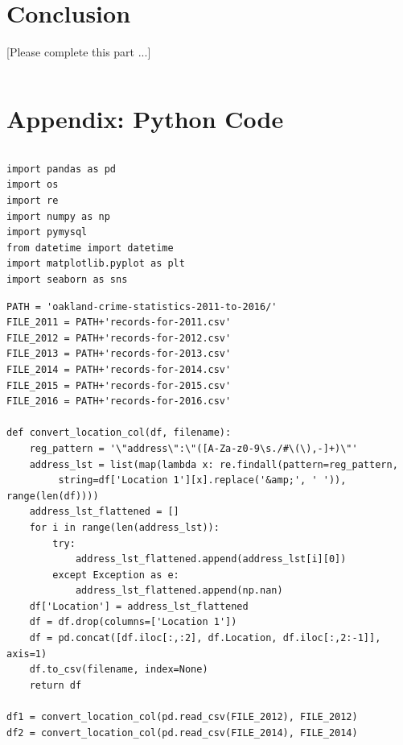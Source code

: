 \documentclass{article} %
\begin{document}
\section{Conclusion}


[Please complete this part ...]

\[\]





\section{Appendix: Python Code}

\[\]

\appendix

\lstset{language=python}
\lstset{frame=lines}
\lstset{basicstyle=\footnotesize}
\begin{lstlisting}
import pandas as pd
import os
import re
import numpy as np
import pymysql 
from datetime import datetime
import matplotlib.pyplot as plt
import seaborn as sns
\end{lstlisting}



\label{appendix:preprocess}
\lstset{language=python}
\lstset{frame=lines}
\lstset{basicstyle=\footnotesize}
\begin{lstlisting}
PATH = 'oakland-crime-statistics-2011-to-2016/'
FILE_2011 = PATH+'records-for-2011.csv'
FILE_2012 = PATH+'records-for-2012.csv'
FILE_2013 = PATH+'records-for-2013.csv'
FILE_2014 = PATH+'records-for-2014.csv'
FILE_2015 = PATH+'records-for-2015.csv'
FILE_2016 = PATH+'records-for-2016.csv'

def convert_location_col(df, filename):
	reg_pattern = '\"address\":\"([A-Za-z0-9\s./#\(\),-]+)\"'
	address_lst = list(map(lambda x: re.findall(pattern=reg_pattern,
		 string=df['Location 1'][x].replace('&amp;', ' ')), range(len(df))))
	address_lst_flattened = []
	for i in range(len(address_lst)):
		try:
			address_lst_flattened.append(address_lst[i][0])
		except Exception as e:
			address_lst_flattened.append(np.nan)
	df['Location'] = address_lst_flattened
	df = df.drop(columns=['Location 1'])
	df = pd.concat([df.iloc[:,:2], df.Location, df.iloc[:,2:-1]], axis=1)
	df.to_csv(filename, index=None)
	return df

df1 = convert_location_col(pd.read_csv(FILE_2012), FILE_2012)
df2 = convert_location_col(pd.read_csv(FILE_2014), FILE_2014)
\end{lstlisting}
\end{document}
